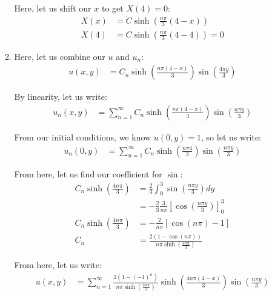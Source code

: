 \documentclass{article}
\begin{document}
\begin{enumerate}
\begin{enumerate}
    Here, let us shift our $x$ to get $X(4) = 0$:
    \begin{align}
      X(x) & = C \sinh(\frac{n \pi}{3} (4 - x))\\
      X(4) & = C \sinh(\frac{n \pi}{3} (4 - 4)) = 0
    \end{align}


    \item Here, let us combine our $u$ and $u_n$:
    \begin{align}
      u(x, y) & = C_n \sinh\left( \frac{n \pi (4 - x)}{3} \right) \sin\left( \frac{4 \pi y}{3} \right)
    \end{align}

    By linearity, let us write:
    \begin{align}
      u_n(x, y) & =
      \sum^\infty_{n = 1}
      C_n \sinh\left( \frac{n \pi( 4 - x)}{3} \right)
      \sin\left( \frac{n \pi y}{3} \right)
    \end{align}

    From our initial conditions, we know $u(0, y) = 1$, so let us write:
    \begin{align}
      u_n(0, y) & =
      \sum^\infty_{n = 1}
      C_n \sinh\left( \frac{n \pi 4}{3} \right)
      \sin\left( \frac{n \pi y}{3} \right)
    \end{align}

    From here, let us find our coefficient for $\sin$:
    \begin{align}
      C_n \sinh\left(\frac{4 n \pi}{3}\right) & =
      \frac{2}{3} \int^3_0 \sin\left( \frac{n \pi y}{3} \right) dy\\
      & = -
      \frac{2}{3} \frac{3}{n \pi} \left[ \cos \left( \frac{n \pi y}{3} \right) \right]^3_0\\
      C_n \sinh\left(\frac{4 n \pi}{3}\right) & = -
      \frac{2}{n \pi} \left[ \cos (n \pi) - 1 \right]\\
      C_n & = \frac{2 (1 - \cos (n \pi))}{n \pi \sinh(\frac{4 n \pi}{3})}
    \end{align}

    From here, let us write:
    \begin{align}
      u(x, y) & =
      \sum^\infty_{n = 1}
      \frac{2 (1 - (-1)^n)}{n \pi \sinh(\frac{4 n \pi}{3})}
      \sinh\left(\frac{4 n \pi(4 - x)}{3}\right)
      \sin\left(\frac{n \pi y}{3}\right)
    \end{align}
  \end{enumerate}




\end{enumerate}
\end{document}
